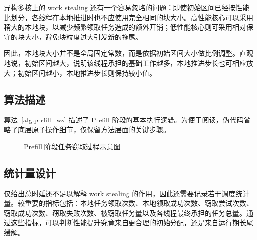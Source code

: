 异构多核上的 work stealing 还有一个容易忽略的问题：即使初始区间已经按性能比划分，各线程在本地推进时也不应使用完全相同的块大小。高性能核心可以采用稍大的本地块，以减少频繁领取任务造成的额外开销；低性能核心则可采用相对保守的块大小，避免块粒度过大引发新的拖尾。

因此，本地块大小并不是全局固定常数，而是依据初始区间大小做比例调整。直观地说，初始区间越大，说明该线程承担的基础工作越多，本地推进步长也可相应放大；初始区间越小，本地推进步长则保持较小值。

\subsection{算法描述}

算法~\ref{alg:prefill_ws} 描述了 Prefill 阶段的基本执行逻辑。为便于阅读，伪代码省略了底层原子操作细节，仅保留方法层面的关键步骤。

\begin{algorithm}[ht]
\caption{Prefill 阶段的本地优先 work stealing}
\label{alg:prefill_ws}
\end{algorithm}

\begin{figure}[ht]
  \centering
  \caption{Prefill 阶段任务窃取过程示意图}
  \label{fig:prefill_ws_placeholder}
\end{figure}

\subsection{统计量设计}

仅给出总时延还不足以解释 work stealing 的作用，因此还需要记录若干调度统计量。较重要的指标包括：本地任务领取次数、本地领取成功次数、窃取尝试次数、窃取成功次数、窃取失败次数、被窃取任务量以及各线程最终承担的任务总量。通过这些指标，可以判断性能提升究竟来自更合理的初始分配，还是来自运行期长尾缓解。

